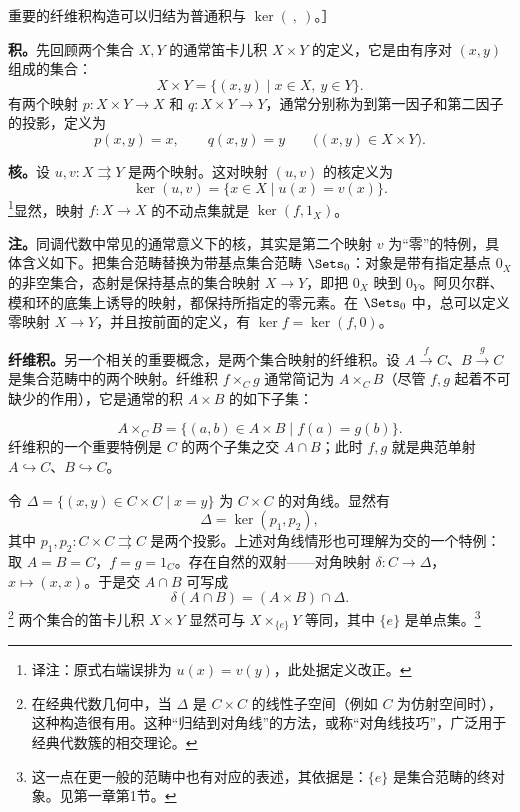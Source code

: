 重要的纤维积构造可以归结为普通积与 $\ker(\ ,\ )$。］

\textbf{积。}先回顾两个集合 $X,Y$ 的通常笛卡儿积 $X\times Y$ 的定义，它是由有序对 $(x,y)$ 组成的集合：
\begin{equation}\tag{1.4}
 X\times Y=\{(x,y)\mid x\in X,\ y\in Y\}.
\end{equation}
有两个映射 $p:X\times Y\to X$ 和 $q:X\times Y\to Y$，通常分别称为到第一因子和第二因子的投影，定义为
\begin{equation}\tag{1.5}
 p(x,y)=x,\qquad q(x,y)=y\qquad\bigl((x,y)\in X\times Y\bigr).
\end{equation}

\textbf{核。}设 $u,v:X\rightrightarrows Y$ 是两个映射。这对映射 $(u,v)$ 的核定义为
\begin{equation}\tag{1.6}
 \ker(u,v)=\{x\in X\mid u(x)=v(x)\}.
\end{equation}
\footnote{译注：原式右端误排为 $u(x)=v(y)$，此处据定义改正。}显然，映射 $f:X\to X$ 的不动点集就是 $\ker(f,1_X)$。

\textbf{注。}同调代数中常见的通常意义下的核，其实是第二个映射 $v$ 为“零”的特例，具体含义如下。把集合范畴替换为带基点集合范畴 $\Sets_0$：对象是带有指定基点 $0_X$ 的非空集合，态射是保持基点的集合映射 $X\to Y$，即把 $0_X$ 映到 $0_Y$。阿贝尔群、模和环的底集上诱导的映射，都保持所指定的零元素。在 $\Sets_0$ 中，总可以定义零映射 $X\to Y$，并且按前面的定义，有 $\ker f=\ker(f,0)$。

\textbf{纤维积。}另一个相关的重要概念，是两个集合映射的纤维积。设 $A\xrightarrow f C$、$B\xrightarrow g C$ 是集合范畴中的两个映射。纤维积 $f\times_C g$ 通常简记为 $A\times_C B$（尽管 $f,g$ 起着不可缺少的作用），它是通常的积 $A\times B$ 的如下子集：

\begin{equation}\tag{1.7}
 A\times_C B=\{(a,b)\in A\times B\mid f(a)=g(b)\}.
\end{equation}
纤维积的一个重要特例是 $C$ 的两个子集之交 $A\cap B$；此时 $f,g$ 就是典范单射 $A\hookrightarrow C$、$B\hookrightarrow C$。

令 $\Delta=\{(x,y)\in C\times C\mid x=y\}$ 为 $C\times C$ 的对角线。显然有
\begin{equation}\tag{1.8}
 \Delta=\ker(p_1,p_2),
\end{equation}
其中 $p_1,p_2:C\times C\rightrightarrows C$ 是两个投影。上述对角线情形也可理解为交的一个特例：取 $A=B=C$，$f=g=1_C$。存在自然的双射——对角映射 $\delta:C\to\Delta$，$x\mapsto(x,x)$。于是交 $A\cap B$ 可写成
\begin{equation}\tag{1.9}
 \delta(A\cap B)=(A\times B)\cap\Delta.
\end{equation}
\footnote{在经典代数几何中，当 $\Delta$ 是 $C\times C$ 的线性子空间（例如 $C$ 为仿射空间时），这种构造很有用。这种“归结到对角线”的方法，或称“对角线技巧”，广泛用于经典代数簇的相交理论。}
两个集合的笛卡儿积 $X\times Y$ 显然可与 $X\times_{\{e\}}Y$ 等同，其中 $\{e\}$ 是单点集。\footnote{这一点在更一般的范畴中也有对应的表述，其依据是：$\{e\}$ 是集合范畴的终对象。见第一章第1节。}

